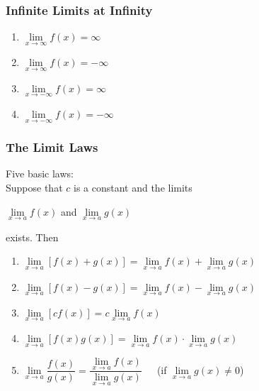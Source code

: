 \documentclass{beamer}
\begin{document}
	\begin{frame}
		\frametitle{Infinite Limits at Infinity}
		\begin{enumerate}
			\item $\lim\limits_{\textit{x} \to \infty}f(x) = \infty$
			\item $\lim\limits_{\textit{x} \to \infty}f(x) = -\infty$
			\item $\lim\limits_{\textit{x} \to -\infty}f(x) = \infty$
			\item $\lim\limits_{\textit{x} \to -\infty}f(x) = -\infty$
		\end{enumerate}
	\end{frame}
	\begin{frame}
		\frametitle{The Limit Laws}
		Five basic laws:\\
		Suppose that $c$ is a constant and the limits
		\begin{center}
			$\lim\limits_{\textit{x} \to a}f(x)$ and $\lim\limits_{\textit{x} \to a}g(x)$
		\end{center}
		exists. Then
		\begin{enumerate}
			\item $\lim\limits_{\textit{x} \to a}[f(x)+g(x)] = \lim\limits_{\textit{x} \to a}f(x) + \lim\limits_{\textit{x} \to a}g(x)$
			\item $\lim\limits_{\textit{x} \to a}[f(x)-g(x)] = \lim\limits_{\textit{x} \to a}f(x) - \lim\limits_{\textit{x} \to a}g(x)$
			\item $\lim\limits_{\textit{x} \to a}[cf(x)] = c\lim\limits_{\textit{x} \to a}f(x)$
			\item $\lim\limits_{\textit{x} \to a}[f(x)g(x)] = \lim\limits_{\textit{x} \to a}f(x) \cdot \lim\limits_{\textit{x} \to a}g(x)$
			\item $\lim\limits_{\textit{x} \to a}\dfrac{f(x)}{g(x)} = \dfrac{\lim\limits_{\textit{x} \to a}f(x)}{\lim\limits_{\textit{x} \to a}g(x)}$\ \ \  \alert{(if $\lim\limits_{\textit{x} \to a}g(x) \neq 0$)}
		\end{enumerate}
	\end{frame}
\end{document}
